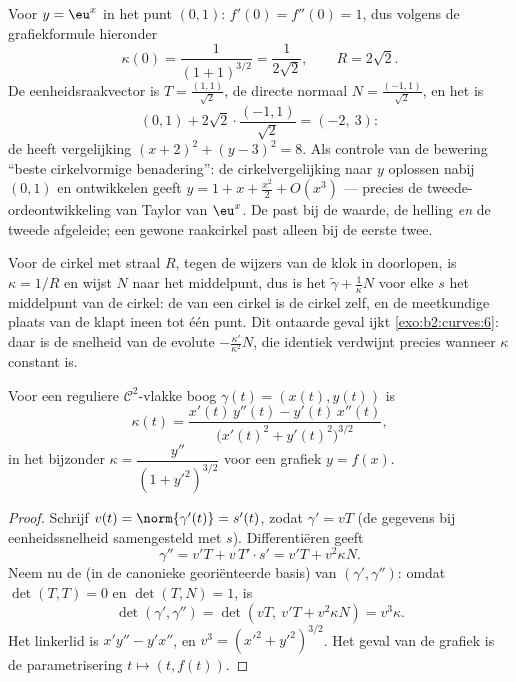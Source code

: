\begin{example}\label{ex:b2:curves:oscexp}
Voor $y = \eu^x$ in het punt $(0, 1)$: $f'(0) = f''(0) = 1$, dus
volgens de grafiekformule hieronder
\[
\kappa(0) = \frac{1}{(1 + 1)^{3/2}} = \frac1{2\sqrt2},
\qquad R = 2\sqrt2 .
\]
De eenheidsraakvector is $T = \frac{(1, 1)}{\sqrt2}$, de directe
normaal $N = \frac{(-1, 1)}{\sqrt2}$, en het
 is
\[
(0, 1) + 2\sqrt2\cdot\frac{(-1, 1)}{\sqrt2} = (-2,\ 3) :
\]
de  heeft vergelijking $(x + 2)^2 + (y - 3)^2 =
8$. Als controle van de bewering ``beste cirkelvormige
benadering'': de cirkelvergelijking naar $y$ oplossen nabij $(0,1)$
en ontwikkelen geeft $y = 1 + x + \frac{x^2}2 + O(x^3)$ --- precies
de tweede-ordeontwikkeling van Taylor van $\eu^x$. De  past bij de waarde, de helling \emph{en} de tweede
afgeleide; een gewone raakcirkel past alleen bij de eerste twee.
\end{example}

\begin{example}\label{ex:b2:curves:circleevolute}
Voor de cirkel met straal $R$, tegen de wijzers van de klok in
doorlopen, is $\kappa = 1/R$ en wijst $N$ naar het middelpunt, dus
is het  $\tilde\gamma + \frac1\kappa N$ voor
elke $s$ het middelpunt van de cirkel: de  van
een cirkel is de cirkel zelf, en de meetkundige plaats van de
 klapt ineen tot één punt. Dit ontaarde geval
ijkt \cref{exo:b2:curves:6}: daar is de snelheid van de evolute
$-\frac{\kappa'}{\kappa^2}N$, die identiek verdwijnt precies
wanneer $\kappa$ constant is.
\end{example}

\begin{proposition}\label{prop:b2:curves:kappaformula}
Voor een reguliere $\mathcal{C}^2$-vlakke boog $\gamma(t) = (x(t),
y(t))$ is
\[
\kappa(t)
= \frac{x'(t)\,y''(t) - y'(t)\,x''(t)}
       {\bigl(x'(t)^2 + y'(t)^2\bigr)^{3/2}} ,
\]
in het bijzonder $\kappa = \dfrac{y''}{(1 + y'^2)^{3/2}}$ voor een
grafiek $y = f(x)$.
\end{proposition}

\begin{proof}
Schrijf $v(t) = \norm{\gamma'(t)} = s'(t)$, zodat $\gamma' = vT$
(de gegevens bij eenheidssnelheid samengesteld met $s$).
Differentiëren geeft
\[
\gamma'' = v'T + v\,T'\cdot s' = v'T + v^2\kappa N .
\]
Neem nu de  (in de canonieke georiënteerde basis) van
$(\gamma', \gamma'')$: omdat $\det(T, T) = 0$ en $\det(T, N) = 1$,
is
\[
\det(\gamma', \gamma'') = \det(vT,\ v'T + v^2\kappa N)
= v^3\kappa .
\]
Het linkerlid is $x'y'' - y'x''$, en $v^3 = (x'^2 + y'^2)^{3/2}$.
Het geval van de grafiek is de parametrisering $t \mapsto (t,
f(t))$.
\end{proof}

